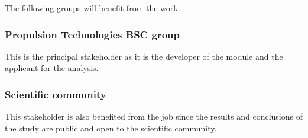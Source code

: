 \justify
The following groups will benefit from the work.

\subsubsection{Propulsion Technologies BSC group}

\justify
This is the principal stakeholder as it is the developer of the module and the applicant for the analysis.

\subsubsection{Scientific community}

\justify
This stakeholder is also benefited from the job since the results and conclusions of the study are public and open to the scientific community.
